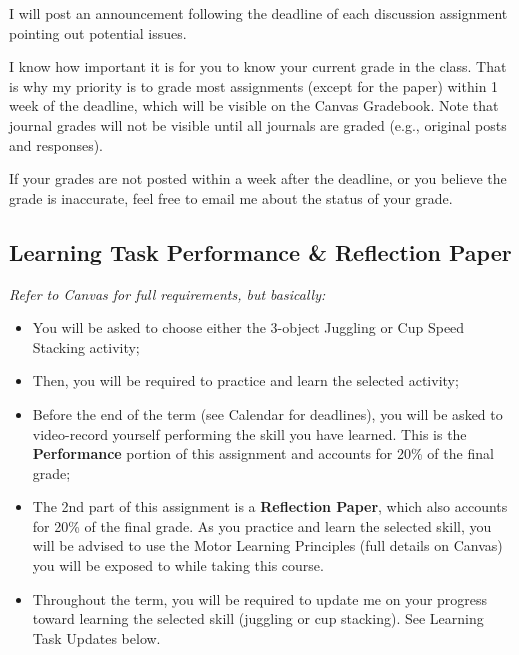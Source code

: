 \documentclass[
  letterpaper,
  DIV=11,
  numbers=noendperiod,
  oneside]{scrartcl}
\providecommand{\tightlist}{%
  \setlength{\itemsep}{0pt}\setlength{\parskip}{0pt}}\usepackage{longtable,booktabs,array}
\begin{document}
I will post an announcement following the deadline of each discussion
assignment pointing out potential issues.

\begin{tcolorbox}[enhanced jigsaw, breakable, colbacktitle=quarto-callout-note-color!10!white, colframe=quarto-callout-note-color-frame, opacitybacktitle=0.6, title=\textcolor{quarto-callout-note-color}{\faInfo}\hspace{0.5em}{Note}, opacityback=0, colback=white, bottomrule=.15mm, toprule=.15mm, left=2mm, rightrule=.15mm, toptitle=1mm, titlerule=0mm, arc=.35mm, bottomtitle=1mm, leftrule=.75mm, coltitle=black]
I know how important it is for you to know your current grade in the
class. That is why my priority is to grade most assignments (except for
the paper) within 1 week of the deadline, which will be visible on the
Canvas Gradebook. Note that journal grades will not be visible until all
journals are graded (e.g., original posts and responses).~

If your grades are not posted within a week after the deadline, or you
believe the grade is inaccurate, feel free to email me about the status
of your grade.
\end{tcolorbox}

\hypertarget{learning-task-performance-reflection-paper}{%
\subsection{Learning Task Performance \& Reflection
Paper}\label{learning-task-performance-reflection-paper}}

\emph{Refer to Canvas for full requirements, but basically:}

\begin{itemize}
\tightlist
\item
  You will be asked to choose either the 3-object Juggling or Cup Speed
  Stacking activity;
\item
  Then, you will be required to practice and learn the selected
  activity;
\item
  Before the end of the term (see Calendar for deadlines), you will be
  asked to video-record yourself performing the skill you have learned.
  This is the \textbf{Performance} portion of this assignment and
  accounts for 20\% of the final grade;
\item
  The 2nd part of this assignment is a \textbf{Reflection Paper}, which
  also accounts for 20\% of the final grade. As you practice and learn
  the selected skill, you will be advised to use the Motor Learning
  Principles (full details on Canvas) you will be exposed to while
  taking this course.
\item
  Throughout the term, you will be required to update me on your
  progress toward learning the selected skill (juggling or cup
  stacking). See Learning Task Updates below.
\end{itemize}
\end{document}

